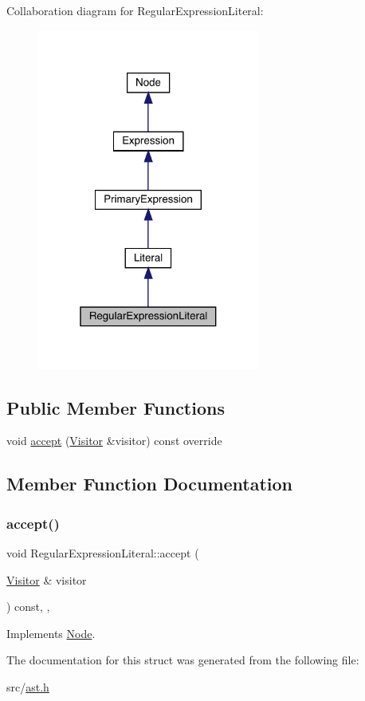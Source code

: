 Collaboration diagram for Regular\+Expression\+Literal\+:
\nopagebreak
\begin{figure}[H]
\begin{center}
\leavevmode
\includegraphics[width=208pt]{struct_regular_expression_literal__coll__graph}
\end{center}
\end{figure}
\subsection*{Public Member Functions}
\begin{DoxyCompactItemize}
\item 
void \hyperlink{struct_regular_expression_literal_a0df8cb8e68e12de1751821c9a1c60617}{accept} (\hyperlink{struct_visitor}{Visitor} \&visitor) const override
\end{DoxyCompactItemize}


\subsection{Member Function Documentation}
\mbox{\label{struct_regular_expression_literal_a0df8cb8e68e12de1751821c9a1c60617}} 
\subsubsection{\texorpdfstring{accept()}{accept()}}
{\footnotesize\ttfamily void Regular\+Expression\+Literal\+::accept (\begin{DoxyParamCaption}\item[{\hyperlink{struct_visitor}{Visitor} \&}]{visitor }\end{DoxyParamCaption}) const\hspace{0.3cm}{\ttfamily [inline]}, {\ttfamily [override]}, {\ttfamily [virtual]}}



Implements \hyperlink{struct_node_a10bd7af968140bbf5fa461298a969c71}{Node}.



The documentation for this struct was generated from the following file\+:\begin{DoxyCompactItemize}
\item 
src/\hyperlink{ast_8h}{ast.\+h}\end{DoxyCompactItemize}

